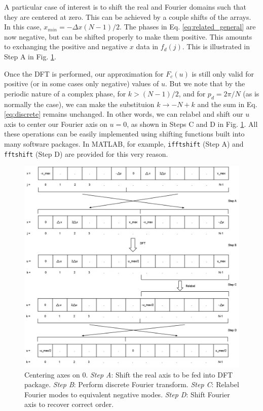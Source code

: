 \documentclass{article}
\begin{document}
A particular case of interest is to shift the real and Fourier domains such that they are centered at zero.  This can be achieved by a couple shifts of the arrays.  In this case, $x_{min} = -\Delta x (N-1)/2$.  The phases in Eq. \ref{eq:related_general} are now negative, but can be shifted properly to make them positive.  This amounts to exchanging the positive and negative $x$ data in $f_d(j)$.  This is illustrated in Step A in Fig. \ref{fig:shifting}.

Once the DFT is performed, our approximation for $F_c(u)$ is still only valid for positive (or in some cases only negative) values of $u$.  But we note that by the periodic nature of a complex phase, for $k>(N-1)/2$, and for $p_d = 2 \pi / N$ (as is normally the case), we can make the substituion $k\rightarrow-N+k$ and the sum in Eq. \ref{eq:discrete} remains unchanged.  In other words, we can relabel and shift our $u$ axis to center our Fourier axis on $u=0$, as shown in Steps C and D in Fig. \ref{fig:shifting}.  All these operations can be easily implemented using shifting functions built into many software packages.  In MATLAB, for example, \texttt{ifftshift} (Step A) and \texttt{fftshift} (Step D) are provided for this very reason.


\begin{figure}
\begin{center}
\centerline{\includegraphics[width=7in]{FFT_shifts.jpg}}
\end{center}
\caption{Centering axes on 0.  \emph{Step A}: Shift the real axis to be fed into DFT package.  \emph{Step B}: Perform discrete Fourier transform.  \emph{Step C}: Relabel Fourier modes to equivalent negative modes.  \emph{Step D}: Shift Fourier axis to recover correct order.}
\label{fig:shifting}
\end{figure}
\end{document}
